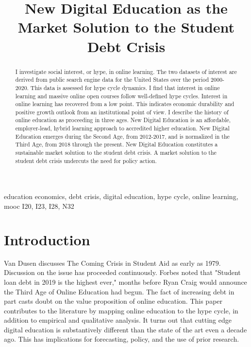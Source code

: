 \documentclass[review]{elsarticle}
\begin{document}
\begin{frontmatter}

\title{
    New Digital Education as the Market Solution to the Student Debt Crisis
}


\begin{abstract}
    I investigate social interest, or hype, in online learning.
    The two datasets of interest are derived from public search engine data for the United States over the period 2000-2020.
    This data is assessed for hype cycle dynamics.
    I find that interest in online learning and massive online open courses follow well-defined hype cycles.
    Interest in online learning has recovered from a low point.
    This indicates economic durability and positive growth outlook from an institutional point of view.
    I describe the history of online education as proceeding in three ages.
    New Digital Education is an affordable, employer-lead, hybrid learning approach to accredited higher education.
    New Digital Education emerges during the Second Age, from 2012-2017, and is normalized in the Third Age, from 2018 through the present.
    New Digital Education constitutes a sustainable market solution to the student debt crisis.
    A market solution to the student debt crisis undercuts the need for policy action.
\end{abstract}

\begin{keyword}
education economics, debt crisis, digital education, hype cycle, online learning, mooc
\MSC[2010] I20, I23, I28, N32
\end{keyword}

\end{frontmatter}

\pagebreak
\linenumbers
        
    \section{Introduction}

    Van Dusen discusses The Coming Crisis in Student Aid as early as 1979\cite{van1979coming}.
    Discussion on the issue has proceeded continuously.
    Forbes\cite{friedman2019student} noted that "Student loan debt in 2019 is the highest ever,"
    months before Ryan Craig would announce the Third Age of Online Education had begun\cite{craig2019welcome}.
    The fact of increasing debt in part casts doubt on the value proposition of online education.
    This paper contributes to the literature by mapping online education to the hype cycle, in addition to empirical and qualitative analysis.
    It turns out that cutting edge digital education is substantively different than the state of the art even a decade ago.
    This has implications for forecasting, policy, and the use of prior research.
\end{document}
